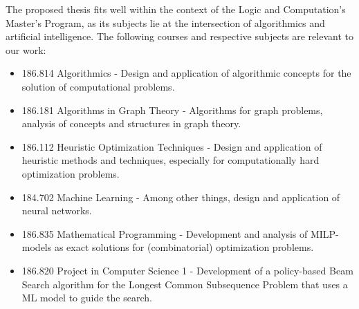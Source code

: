 \documentclass[11pt]{article}
\begin{document}
The proposed thesis fits well within the context of the Logic and Computation's Master's Program, as its subjects lie at the intersection of algorithmics and artificial intelligence. The following courses and respective subjects are relevant to our work:
\begin{itemize}
	\item 186.814 Algorithmics - Design and application of algorithmic concepts for the solution of computational problems. 
	\item 186.181 Algorithms in Graph Theory - Algorithms for graph problems, analysis of concepts and structures in graph theory.
	\item 186.112 Heuristic Optimization Techniques - Design and application of heuristic methods and techniques, especially for computationally hard optimization problems.
	\item 184.702 Machine Learning - Among other things, design and application of neural networks.
	\item 186.835 Mathematical Programming - Development and analysis of MILP-models as exact solutions for (combinatorial) optimization problems.
	\item 186.820 Project in Computer Science 1 - Development of a policy-based Beam Search algorithm for the Longest Common Subsequence Problem that uses a ML model to guide the search. 
\end{itemize}

 

\end{document}
